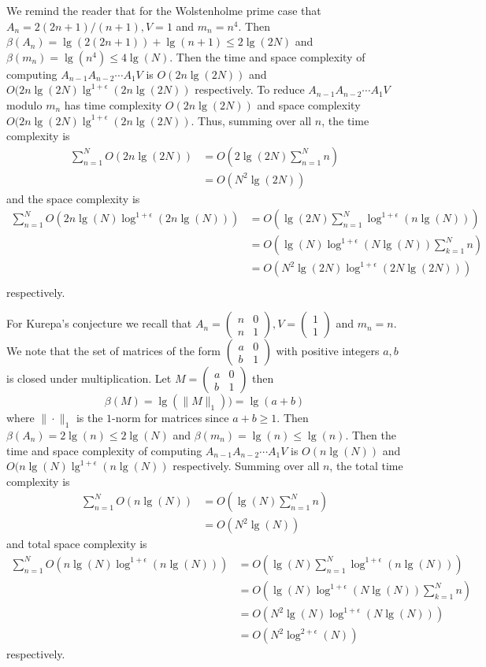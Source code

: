 We remind the reader that for the Wolstenholme prime case that $A_n=2(2n+1)/(n+1),V=1$ and $m_n=n^4$. Then $\beta(A_n)=\lg(2(2n+1))+\lg(n+1)\leq 2\lg(2N)$ and $\beta(m_n)=\lg(n^4)\leq 4\lg(N)$. Then the time and space complexity of computing $A_{n-1} A_{n-2}\cdots A_{1} V$ is $O(2n\lg(2N))$ and $O(2n\lg(2N)\lg^{1+\epsilon}(2n\lg(2N))$ respectively. To reduce $A_{n-1}A_{n-2}\cdots A_{1} V$ modulo $m_n$ has time complexity $O(2n\lg(2N))$ and space complexity          
$O(2n\lg(2N)\lg^{1+\epsilon}(2n\lg(2N))$. Thus, summing over all $n$, the time complexity is 
\begin{align*} \sum_{n=1}^{N} O(2n\lg(2N)) &= O(2\lg(2N)\sum_{n=1}^{N} n) \\
&=O(N^2\lg(2N)) \end{align*} and the space complexity is 
\begin{align*} \sum_{n=1}^{N} O(2n\lg(N)\log^{1+\epsilon}(2n\lg(N))) &= O(\lg(2N)\sum_{n=1}^{N}\log^{1+\epsilon}(n\lg(N)))\\
 &=O(\lg(N)\log^{1+\epsilon}(N\lg(N))\sum_{k=1}^{N} n) \\
 &=O(N^{2}\lg(2N)\log^{1+\epsilon}(2N\lg(2N)) ) \\
 \end{align*} respectively. 
 
For Kurepa's conjecture we recall that $A_n=\begin{pmatrix} n & 0 \\ n & 1 \end{pmatrix}, V=\begin{pmatrix} 1 \\1 \end{pmatrix}$ and $ m_n=n$. We note that the set of matrices of the form $\begin{pmatrix} a & 0 \\ b & 1 \end{pmatrix}$ with positive integers $a,b$ is closed under multiplication. Let $M=\begin{pmatrix} a & 0 \\ b & 1 \end{pmatrix}$ then \[\beta(M)=\lg(\|M\|_{1}))=\lg(a+b)\] where $\|\cdot \|_{1}$ is the $1$-norm for matrices since $a+b\geq 1$. Then $\beta(A_n)=2\lg(n)\leq 2\lg(N)$ and $\beta(m_n)=\lg(n)\leq \lg(n)$. Then the time and space complexity of computing $A_{n-1} A_{n-2}\cdots A_{1} V$ is $O(n\lg(N))$ and $O(n\lg(N)\lg^{1+\epsilon}(n\lg(N))$ respectively. Summing over all $n$, the total time complexity is \begin{align*} \sum_{n=1}^{N} O(n\lg(N)) &= O(\lg(N)\sum_{n=1}^{N} n) \\
&=O(N^2\lg(N)) \end{align*} and total space complexity is 
\begin{align*} \sum_{n=1}^{N} O(n\lg(N)\log^{1+\epsilon}(n\lg(N))) &= O(\lg(N)\sum_{n=1}^{N}\log^{1+\epsilon}(n\lg(N)))\\
 &=O(\lg(N)\log^{1+\epsilon}(N\lg(N))\sum_{k=1}^{N} n) \\
 &=O(N^{2}\lg(N)\log^{1+\epsilon}(N\lg(N)) ) \\
 &=O(N^{2}\log^{2+\epsilon}(N))
 \end{align*} respectively.  
 
